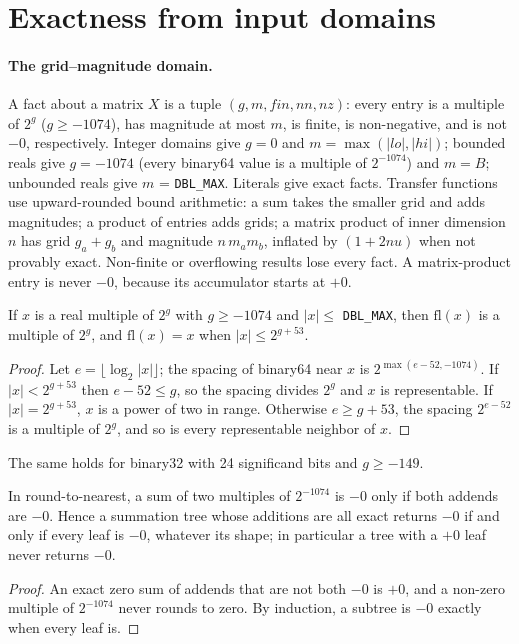 \documentclass[acmsmall,review,anonymous,nonacm]{acmart}
\newcommand{\fl}{\mathrm{fl}}
\newcommand{\abs}[1]{\lvert #1\rvert}
\begin{document}
\section{Exactness from input domains}\label{sec:exact}
\paragraph{The grid--magnitude domain.} A fact about a matrix $X$ is a tuple
$(g, m, \mathit{fin}, \mathit{nn}, \mathit{nz})$: every entry is a multiple of
$2^g$ ($g\ge-1074$), has magnitude at most $m$, is finite, is non-negative, and
is not $-0$, respectively. Integer domains give $g=0$ and $m=\max(\abs{lo},
\abs{hi})$; bounded reals give $g=-1074$ (every binary64 value is a multiple of
$2^{-1074}$) and $m=B$; unbounded reals give $m$ = \texttt{DBL\_MAX}. Literals
give exact facts. Transfer functions use upward-rounded bound arithmetic: a sum
takes the smaller grid and adds magnitudes; a product of entries adds grids;
a matrix product of inner dimension $n$ has grid $g_a + g_b$ and magnitude
$n\,m_a m_b$, inflated by $(1+2nu)$ when not provably exact. Non-finite or
overflowing results lose every fact. A matrix-product entry is never $-0$,
because its accumulator starts at $+0$.

\begin{lemma}\label{lem:grid}
If $x$ is a real multiple of $2^g$ with $g\ge-1074$ and $\abs{x}\le$
\texttt{DBL\_MAX}, then $\fl(x)$ is a multiple of $2^g$, and $\fl(x)=x$ when
$\abs{x}\le2^{g+53}$.
\end{lemma}
\begin{proof}
Let $e=\lfloor\log_2\abs{x}\rfloor$; the spacing of binary64 near $x$ is
$2^{\max(e-52,-1074)}$. If $\abs{x}<2^{g+53}$ then $e-52\le g$, so the spacing
divides $2^g$ and $x$ is representable. If $\abs{x}=2^{g+53}$, $x$ is a power of
two in range. Otherwise $e\ge g+53$, the spacing $2^{e-52}$ is a multiple of
$2^g$, and so is every representable neighbor of $x$.
\end{proof}
The same holds for binary32 with 24 significand bits and $g\ge-149$.

\begin{lemma}\label{lem:zero}
In round-to-nearest, a sum of two multiples of $2^{-1074}$ is $-0$ only if both
addends are $-0$. Hence a summation tree whose additions are all exact returns
$-0$ if and only if every leaf is $-0$, whatever its shape; in particular a tree
with a $+0$ leaf never returns $-0$.
\end{lemma}
\begin{proof}
An exact zero sum of addends that are not both $-0$ is $+0$, and a non-zero
multiple of $2^{-1074}$ never rounds to zero. By induction, a subtree is $-0$
exactly when every leaf is.
\end{proof}
\end{document}
